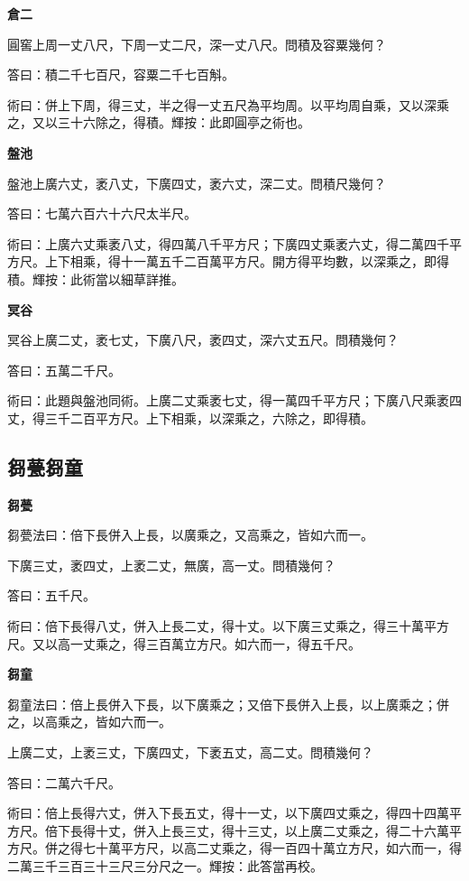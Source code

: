 \documentclass[11pt,a4paper]{article}
\newenvironment{problemenv}[1]{%
  \medskip\noindent\textbf{#1}\par\nopagebreak\smallskip
}{\medskip}
\begin{document}
\begin{problemenv}{倉二}
圓窖上周一丈八尺，下周一丈二尺，深一丈八尺。問積及容粟幾何？

\textsf{答曰：}積二千七百尺，容粟二千七百斛。

\textsf{術曰：}併上下周，得三丈，半之得一丈五尺為平均周。以平均周自乘，又以深乘之，又以三十六除之，得積。輝按：此即圓亭之術也。
\end{problemenv}

\begin{problemenv}{盤池}
盤池上廣六丈，袤八丈，下廣四丈，袤六丈，深二丈。問積尺幾何？

\textsf{答曰：}七萬六百六十六尺太半尺。

\textsf{術曰：}上廣六丈乘袤八丈，得四萬八千平方尺；下廣四丈乘袤六丈，得二萬四千平方尺。上下相乘，得十一萬五千二百萬平方尺。開方得平均數，以深乘之，即得積。輝按：此術當以細草詳推。
\end{problemenv}

\begin{problemenv}{冥谷}
冥谷上廣二丈，袤七丈，下廣八尺，袤四丈，深六丈五尺。問積幾何？

\textsf{答曰：}五萬二千尺。

\textsf{術曰：}此題與盤池同術。上廣二丈乘袤七丈，得一萬四千平方尺；下廣八尺乘袤四丈，得三千二百平方尺。上下相乘，以深乘之，六除之，即得積。
\end{problemenv}

\subsection{芻甍芻童}

\begin{problemenv}{芻甍}
芻甍法曰：倍下長併入上長，以廣乘之，又高乘之，皆如六而一。

下廣三丈，袤四丈，上袤二丈，無廣，高一丈。問積幾何？

\textsf{答曰：}五千尺。

\textsf{術曰：}倍下長得八丈，併入上長二丈，得十丈。以下廣三丈乘之，得三十萬平方尺。又以高一丈乘之，得三百萬立方尺。如六而一，得五千尺。
\end{problemenv}

\begin{problemenv}{芻童}
芻童法曰：倍上長併入下長，以下廣乘之；又倍下長併入上長，以上廣乘之；併之，以高乘之，皆如六而一。

上廣二丈，上袤三丈，下廣四丈，下袤五丈，高二丈。問積幾何？

\textsf{答曰：}二萬六千尺。

\textsf{術曰：}倍上長得六丈，併入下長五丈，得十一丈，以下廣四丈乘之，得四十四萬平方尺。倍下長得十丈，併入上長三丈，得十三丈，以上廣二丈乘之，得二十六萬平方尺。併之得七十萬平方尺，以高二丈乘之，得一百四十萬立方尺，如六而一，得二萬三千三百三十三尺三分尺之一。輝按：此答當再校。
\end{problemenv}
\end{document}
